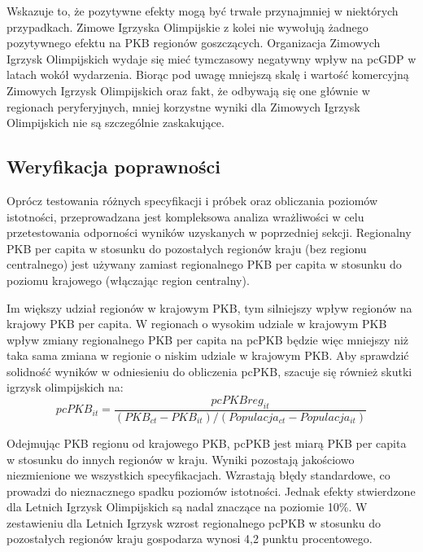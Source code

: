 \documentclass[12pt]{article}
\begin{document}
    Wskazuje to, że pozytywne efekty mogą być trwałe przynajmniej w niektórych przypadkach. Zimowe Igrzyska Olimpijskie z kolei nie wywołują żadnego pozytywnego efektu na PKB regionów goszczących. Organizacja Zimowych Igrzysk Olimpijskich wydaje się mieć tymczasowy negatywny wpływ na pcGDP w latach wokół wydarzenia. Biorąc pod uwagę mniejszą skalę i wartość komercyjną Zimowych Igrzysk Olimpijskich oraz fakt, że odbywają się one głównie w regionach peryferyjnych, mniej korzystne wyniki dla Zimowych Igrzysk Olimpijskich nie są szczególnie zaskakujące. \\

    \subsection{Weryfikacja poprawności}
    Oprócz testowania różnych specyfikacji i próbek oraz obliczania poziomów istotności, przeprowadzana jest kompleksowa analiza wrażliwości w celu przetestowania odporności wyników uzyskanych w poprzedniej sekcji. Regionalny PKB per capita w stosunku do pozostałych regionów kraju (bez regionu centralnego) jest używany zamiast regionalnego PKB per capita w stosunku do poziomu krajowego (włączając region centralny). 
    
    Im większy udział regionów w krajowym PKB, tym silniejszy wpływ regionów na krajowy PKB per capita. W regionach o wysokim udziale w krajowym PKB wpływ zmiany regionalnego PKB per capita na pcPKB będzie więc mniejszy niż taka sama zmiana w regionie o niskim udziale w krajowym PKB. Aby sprawdzić solidność wyników w odniesieniu do obliczenia pcPKB, szacuje się również skutki igrzysk olimpijskich na:\\
    
    \[pcPKB_{it} = \frac{pcPKBreg_{it}}{(PKB_{ct} - PKB_{it}) / (Populacja_{ct} - Populacja_{it})}\]
    
    Odejmując PKB regionu od krajowego PKB, pcPKB jest miarą PKB per capita w stosunku do innych regionów w kraju. Wyniki pozostają jakościowo niezmienione we wszystkich specyfikacjach. Wzrastają błędy standardowe, co prowadzi do nieznacznego spadku poziomów istotności. Jednak efekty stwierdzone dla Letnich Igrzysk Olimpijskich są nadal znaczące na poziomie 10\%. W zestawieniu dla Letnich Igrzysk wzrost regionalnego pcPKB w stosunku do pozostałych regionów kraju gospodarza wynosi 4,2 punktu procentowego.\\
    
\newpage
\end{document}
